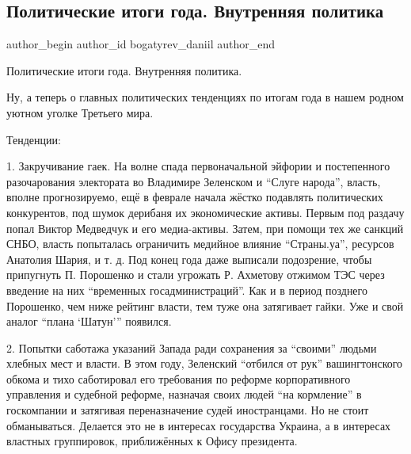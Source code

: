  
 
 
 
 
 
\subsection{Политические итоги года. Внутренняя политика}
\label{sec:28_12_2021.fb.bogatyrev_daniil.1.itogi_vnutr_politika}
 
\ifcmt
 author_begin
   author_id bogatyrev_daniil
 author_end
\fi

Политические итоги года. Внутренняя политика.

Ну, а теперь о главных политических тенденциях по итогам года в нашем родном
уютном уголке Третьего мира.

Тенденции:

1. Закручивание гаек. На волне спада первоначальной эйфории и постепенного
разочарования электората во Владимире Зеленском и \enquote{Слуге народа}, власть,
вполне прогнозируемо, ещё в феврале начала жёстко подавлять политических
конкурентов, под шумок дерибаня их экономические активы. Первым под раздачу
попал Виктор Медведчук и его медиа-активы. Затем, при помощи тех же санкций
СНБО, власть попыталась ограничить медийное влияние \enquote{Страны.уа}, ресурсов
Анатолия Шария, и т. д. Под конец года даже выписали подозрение, чтобы
припугнуть П. Порошенко и стали угрожать Р. Ахметову отжимом ТЭС через введение
на них \enquote{временных госадминистраций}. Как и в период позднего Порошенко, чем
ниже рейтинг власти, тем туже она затягивает гайки. Уже и свой аналог \enquote{плана
\enquote{Шатун}} появился.

2. Попытки саботажа указаний Запада ради сохранения за \enquote{своими} людьми хлебных
мест и власти. В этом году, Зеленский \enquote{отбился от рук} вашингтонского обкома и
тихо саботировал его требования по реформе корпоративного управления и судебной
реформе, назначая своих людей \enquote{на кормление} в госкомпании и затягивая
переназначение судей иностранцами. Но не стоит обманываться. Делается это не в
интересах государства Украина, а в интересах властных группировок, приближённых
к Офису президента.

